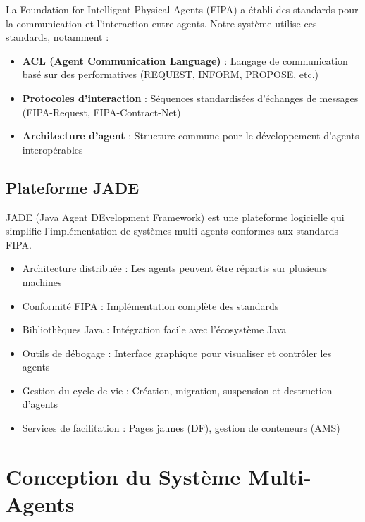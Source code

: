 \documentclass[12pt,a4paper]{article}
\begin{document}
La Foundation for Intelligent Physical Agents (FIPA) a établi des standards pour la communication et l'interaction entre agents. Notre système utilise ces standards, notamment :

\begin{itemize}[leftmargin=*]
    \item[\color{primaryblue}$\blacksquare$] \textbf{ACL (Agent Communication Language)} : Langage de communication basé sur des performatives (REQUEST, INFORM, PROPOSE, etc.)

    \item[\color{primaryblue}$\blacksquare$] \textbf{Protocoles d'interaction} : Séquences standardisées d'échanges de messages (FIPA-Request, FIPA-Contract-Net)

    \item[\color{primaryblue}$\blacksquare$] \textbf{Architecture d'agent} : Structure commune pour le développement d'agents interopérables
\end{itemize}

\subsection{Plateforme JADE}

JADE (Java Agent DEvelopment Framework) est une plateforme logicielle qui simplifie l'implémentation de systèmes multi-agents conformes aux standards FIPA.

\begin{tcolorbox}[colback=lightblue!15, colframe=primaryblue, title=\textbf{Caractéristiques de JADE}]
\begin{itemize}[leftmargin=*]
    \item Architecture distribuée : Les agents peuvent être répartis sur plusieurs machines
    \item Conformité FIPA : Implémentation complète des standards
    \item Bibliothèques Java : Intégration facile avec l'écosystème Java
    \item Outils de débogage : Interface graphique pour visualiser et contrôler les agents
    \item Gestion du cycle de vie : Création, migration, suspension et destruction d'agents
    \item Services de facilitation : Pages jaunes (DF), gestion de conteneurs (AMS)
\end{itemize}
\end{tcolorbox}

\section{Conception du Système Multi-Agents}
\end{document}
